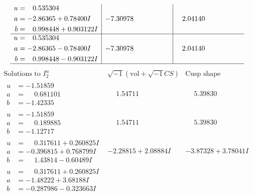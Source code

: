 \documentclass[1p]{elsarticle_modified}
\theoremstyle{definition}
\newcommand{\I}{\sqrt{-1}}
\begin{document}
$$\begin{array}{c|c|c}
\begin{aligned}
u &= \phantom{-}0.535304\phantom{ +0.000000I} \\
a &= -2.86365 + 0.78400 I \\
b &= \phantom{-}0.998448 + 0.903122 I\end{aligned}
 & -7.30978\phantom{ +0.000000I} & \phantom{-}2.04140\phantom{ +0.000000I} \\ \hline\begin{aligned}
u &= \phantom{-}0.535304\phantom{ +0.000000I} \\
a &= -2.86365 - 0.78400 I \\
b &= \phantom{-}0.998448 - 0.903122 I\end{aligned}
 & -7.30978\phantom{ +0.000000I} & \phantom{-}2.04140\phantom{ +0.000000I}\\
 \hline 
 \end{array}$$\newpage$$\begin{array}{c|c|c}  
\text{Solutions to }I^u_{2}& \I (\text{vol} + \sqrt{-1}CS) & \text{Cusp shape}\\
 \hline 
\begin{aligned}
u &= -1.51859\phantom{ +0.000000I} \\
a &= \phantom{-}0.681101\phantom{ +0.000000I} \\
b &= -1.42335\phantom{ +0.000000I}\end{aligned}
 & \phantom{-}1.54711\phantom{ +0.000000I} & \phantom{-}5.39830\phantom{ +0.000000I} \\ \hline\begin{aligned}
u &= -1.51859\phantom{ +0.000000I} \\
a &= \phantom{-}0.189885\phantom{ +0.000000I} \\
b &= -1.12717\phantom{ +0.000000I}\end{aligned}
 & \phantom{-}1.54711\phantom{ +0.000000I} & \phantom{-}5.39830\phantom{ +0.000000I} \\ \hline\begin{aligned}
u &= \phantom{-}0.317611 + 0.260825 I \\
a &= -0.396815 + 0.768799 I \\
b &= \phantom{-}1.43814 - 0.60489 I\end{aligned}
 & -2.28815 + 2.08884 I & -3.87328 + 3.78041 I \\ \hline\begin{aligned}
u &= \phantom{-}0.317611 + 0.260825 I \\
a &= -1.48222 + 3.68188 I \\
b &= -0.287986 - 0.323663 I\end{aligned}

\end{array}$$
\end{document}
